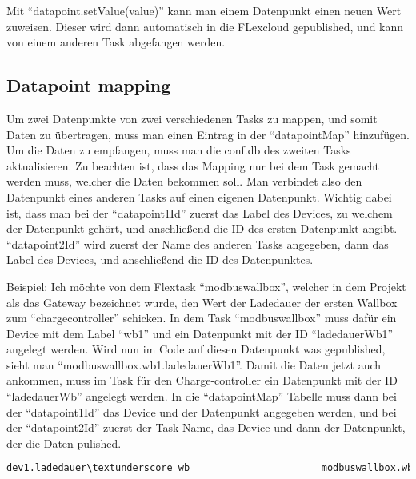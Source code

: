 Mit “datapoint.setValue(value)” kann man einem Datenpunkt einen neuen Wert zuweisen. Dieser wird dann automatisch in die FLexcloud gepublished, und kann von einem anderen Task abgefangen werden.


\subsection{Datapoint mapping}

Um zwei Datenpunkte von zwei verschiedenen Tasks zu mappen, und somit Daten zu übertragen, muss man einen Eintrag in der “datapointMap” hinzufügen. Um die Daten zu empfangen, muss man die conf.db des zweiten Tasks aktualisieren. Zu beachten ist, dass das Mapping nur bei dem Task gemacht werden muss, welcher die Daten bekommen soll. Man verbindet also den Datenpunkt eines anderen Tasks auf einen eigenen Datenpunkt. Wichtig dabei ist, dass man bei der “datapoint1Id” zuerst das Label des Devices, zu welchem der Datenpunkt gehört, und anschließend die ID des ersten Datenpunkt angibt. “datapoint2Id” wird zuerst der Name des anderen Tasks angegeben, dann das Label des Devices, und anschließend die ID des Datenpunktes.

Beispiel: Ich möchte von dem Flextask “modbuswallbox”, welcher in dem Projekt als das Gateway bezeichnet wurde, den Wert der Ladedauer der ersten Wallbox zum “chargecontroller” schicken. In dem Task “modbuswallbox” muss dafür ein Device mit dem Label “wb1” und ein Datenpunkt mit der ID “ladedauerWb1” angelegt werden. Wird nun im Code auf diesen Datenpunkt was gepublished, sieht man “modbuswallbox.wb1.ladedauerWb1”. Damit die Daten jetzt auch ankommen, muss im Task für den Charge-controller ein Datenpunkt mit der ID “ladedauerWb” angelegt werden. In die “datapointMap” Tabelle muss dann bei der “datapoint1Id” das Device und der Datenpunkt angegeben werden, und bei der “datapoint2Id” zuerst der Task Name, das Device und dann der Datenpunkt, der die Daten pulished.





\begin{lstlisting}[language=sql,caption=Example Element,label=lst:impl:foo]
    dev1.ladedauer\textunderscore wb                       modbuswallbox.wb1.ladedauer\textunderscore wb1 
\end{lstlisting}